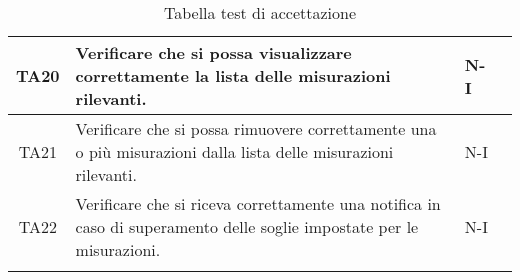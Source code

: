 \begin{longtable}{|c|p{5cm}|p{2cm}|c|}
    \hline
    TA20 & Verificare che si possa visualizzare correttamente la lista delle misurazioni rilevanti. & N-I \\
    \hline
    TA21 & Verificare che si possa rimuovere correttamente una o più misurazioni dalla lista delle misurazioni rilevanti. & N-I \\
    \hline
    TA22 & Verificare che si riceva correttamente una notifica in caso di superamento delle soglie impostate per le misurazioni.
    & N-I \\
    \hline
    \caption{Tabella test di accettazione}
    \label{tab:testsAccettazione}
    \end{longtable}




